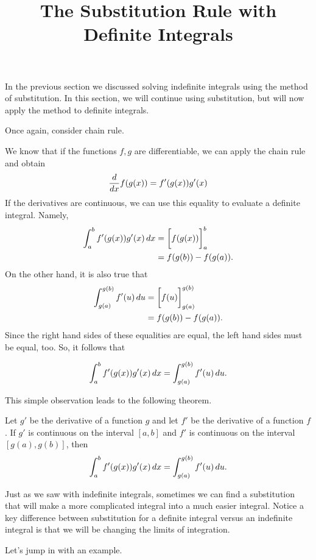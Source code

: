 \documentclass{ximera}
\title{The Substitution Rule with Definite Integrals}
\begin{document}
\maketitle


In the previous section we discussed solving indefinite integrals using the method of substitution. In this section, we will continue using substitution, but will now apply the method to definite integrals. 

Once again, consider chain rule. 

We know that if the functions $f,g$ are differentiable, we can apply the chain rule and obtain
\[
\frac{d}{\mathop{}\!d x} f(g(x)) = f'(g(x))g'(x)
\]
If the derivatives are continuous, we can use this equality to evaluate a definite integral. Namely,
\begin{align*}
  \int_a^b f'(g(x))g'(x) \mathop{}\!d x &= \bigg[ f(g(x)) \bigg]_a^b \\
  &= f(g(b)) - f(g(a)). \\
 \end{align*}
On the other hand, it is also true that
\begin{align*}
  \int_{g(a)}^{g(b)} f'(u)\mathop{}\!d u &= \bigg[ f(u) \bigg]_{g(a)}^{g(b)}\\
  &= f(g(b)) - f(g(a)). \\
 \end{align*}
 Since the right hand sides of these equalities are equal,  the left hand sides must be equal, too. So, it follows that
 
\[
  \int_a^b f'(g(x))g'(x) \mathop{}\!d x =  \int_{g(a)}^{g(b)} f'(u)\mathop{}\!d u .
\]

 
This simple observation  leads to the following theorem. 


\begin{theorem} 
Let $g'$ be the derivative of a  function $g$ and let $f'$ be the derivative of a function $f$. If $g'$ is continuous on the interval $[a,b]$ and  $f'$ is
continuous on the interval $[g(a),g(b)]$, then
\[
\int_a^b f'(g(x)) g'(x) \mathop{}\!d x =\int_{g(a)}^{g(b)} f'(u) \mathop{}\!d u.
\]
\end{theorem}
Just as we saw with indefinite integrals, sometimes we can find a substitution that will make a more complicated integral into a much easier integral. Notice a key difference between substitution for a definite integral versus an indefinite integral is that we will be changing the limits of integration. 

Let's jump in with an example.
\end{document}
